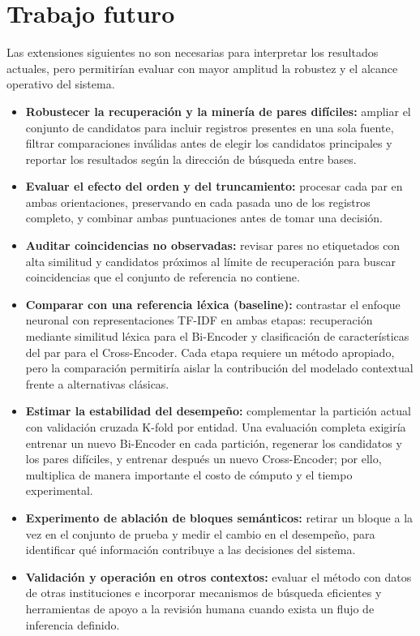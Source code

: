 \section{Trabajo futuro}

Las extensiones siguientes no son necesarias para interpretar los resultados actuales, pero permitirían evaluar con mayor amplitud la robustez y el alcance operativo del sistema.
\begin{itemize}
    \item \textbf{Robustecer la recuperación y la minería de pares difíciles:} ampliar el conjunto de candidatos para incluir registros presentes en una sola fuente, filtrar comparaciones inválidas antes de elegir los candidatos principales y reportar los resultados según la dirección de búsqueda entre bases.
    \item \textbf{Evaluar el efecto del orden y del truncamiento:} procesar cada par en ambas orientaciones, preservando en cada pasada uno de los registros completo, y combinar ambas puntuaciones antes de tomar una decisión.
    \item \textbf{Auditar coincidencias no observadas:} revisar pares no etiquetados con alta similitud y candidatos próximos al límite de recuperación para buscar coincidencias que el conjunto de referencia no contiene.
    \item \textbf{Comparar con una referencia léxica (baseline):} contrastar el enfoque neuronal con representaciones TF-IDF en ambas etapas: recuperación mediante similitud léxica para el Bi-Encoder y clasificación de características del par para el Cross-Encoder. Cada etapa requiere un método apropiado, pero la comparación permitiría aislar la contribución del modelado contextual frente a alternativas clásicas.
    \item \textbf{Estimar la estabilidad del desempeño:} complementar la partición actual con validación cruzada K-fold por entidad. Una evaluación completa exigiría entrenar un nuevo Bi-Encoder en cada partición, regenerar los candidatos y los pares difíciles, y entrenar después un nuevo Cross-Encoder; por ello, multiplica de manera importante el costo de cómputo y el tiempo experimental.
    \item \textbf{Experimento de ablación de bloques semánticos:} retirar un bloque a la vez en el conjunto de prueba y medir el cambio en el desempeño, para identificar qué información contribuye a las decisiones del sistema.
    \item \textbf{Validación y operación en otros contextos:} evaluar el método con datos de otras instituciones e incorporar mecanismos de búsqueda eficientes y herramientas de apoyo a la revisión humana cuando exista un flujo de inferencia definido.
\end{itemize}


